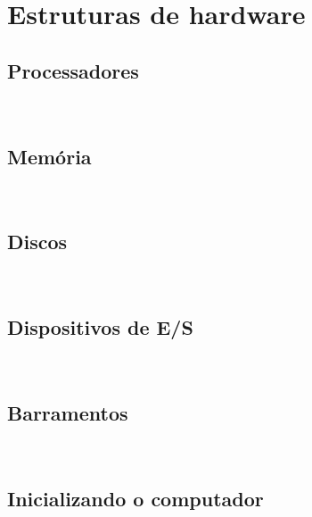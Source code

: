 \section{Estruturas de hardware}

\subsection{Processadores}\\
\subsection{Memória}\\
\subsection{Discos}\\
\subsection{Dispositivos de E/S}\\
\subsection{Barramentos}\\
\subsection{Inicializando o computador}\\